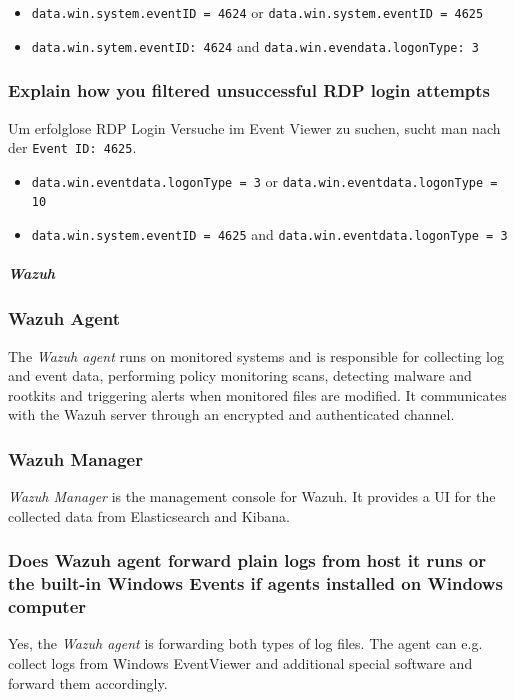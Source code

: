 \begin{itemize}
    \item \lstinline|data.win.system.eventID = 4624| or \lstinline|data.win.system.eventID = 4625|
    \item \lstinline|data.win.sytem.eventID: 4624| and \lstinline|data.win.evendata.logonType: 3|
\end{itemize}

\subsubsection{Explain how you filtered unsuccessful RDP login attempts}
Um erfolglose RDP Login Versuche im Event Viewer zu suchen, sucht man nach der \lstinline|Event ID: 4625|.\\

\begin{itemize}
    \item \lstinline|data.win.eventdata.logonType = 3| or \lstinline|data.win.eventdata.logonType = 10|
    \item \lstinline|data.win.system.eventID = 4625| and \lstinline|data.win.eventdata.logonType = 3|
\end{itemize}

\subparagraph{Wazuh}

\subsubsection{Wazuh Agent}
The \textit{Wazuh agent} runs on monitored systems and is responsible for collecting log and event data, performing policy monitoring scans, detecting malware and rootkits and triggering alerts when monitored files are modified. It communicates with the Wazuh server through an encrypted and authenticated channel.

\subsubsection{Wazuh Manager}
\textit{Wazuh Manager} is the management console for Wazuh. It provides a UI for the collected data from Elasticsearch and Kibana.

\subsubsection{Does Wazuh agent forward plain logs from host it runs or the built-in Windows Events if agents installed on Windows computer}
Yes, the \textit{Wazuh agent} is forwarding both types of log files. The agent can e.g. collect logs from Windows EventViewer and additional special software and forward them accordingly.

